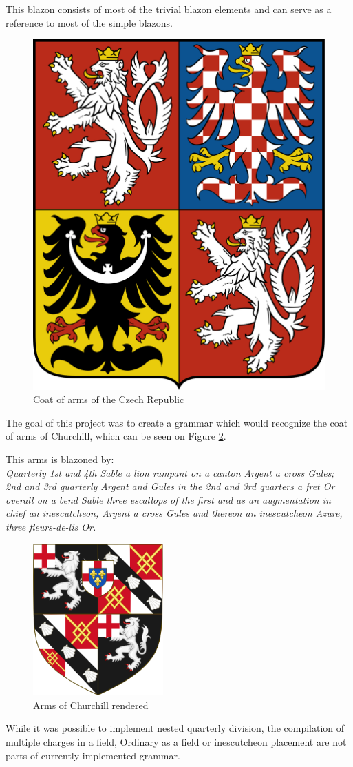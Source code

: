 \documentclass[12pt,a4paper]{article}
\begin{document}
This blazon consists of most of the trivial blazon elements and can serve as a reference to most of the simple blazons.

\begin{figure}[h]
	\centering
	\includegraphics[width=0.2\linewidth]{img/Czech-large}
	\caption{Coat of arms of the Czech Republic}
	\label{fig:czech-large}
\end{figure}

\newpage
The goal of this project was to create a grammar which would recognize the coat of arms of Churchill, which can be seen on Figure \ref{fig:churchill}.

This arms is blazoned by:\\
\textit{Quarterly 1st and 4th Sable a lion rampant on a canton Argent a cross Gules;
2nd and 3rd quarterly Argent and Gules in the 2nd and 3rd quarters a fret Or overall on a bend Sable three escallops of the first and as an augmentation in chief an inescutcheon, Argent a cross Gules and thereon an inescutcheon Azure, three fleurs-de-lis Or.}

\begin{figure}[h]
	\centering
	\includegraphics[width=50mm]{img/512px-Arms_of_Winston_Churchill.png}
	\caption{Arms of Churchill rendered \cite{ArmsOfChurchillImg}}
	\label{fig:churchill}
\end{figure}

While it was possible to implement nested quarterly division, the compilation of multiple charges in a field, Ordinary as a field or inescutcheon placement are not parts of currently implemented grammar.
\end{document}
